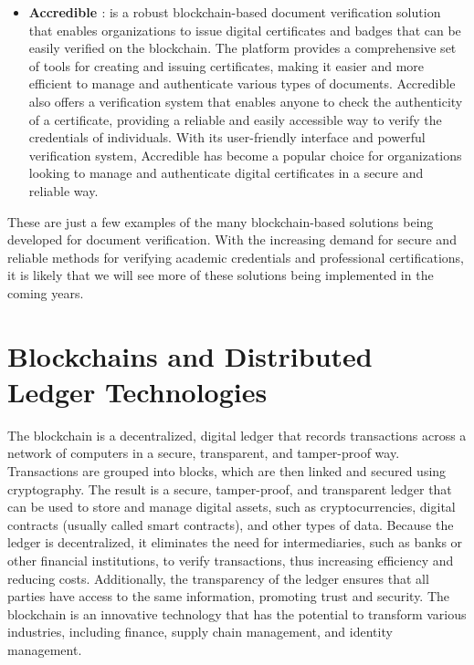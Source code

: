 \documentclass[target=mst,aauheader=]{thud}
\begin{document}
\begin{itemize}
        \item \textbf{Accredible \cite{accredible}}: is a robust blockchain-based document verification solution that enables organizations to issue digital certificates and badges that can be easily verified on the blockchain. The platform provides a comprehensive set of tools for creating and issuing certificates, making it easier and more efficient to manage and authenticate various types of documents. Accredible also offers a verification system that enables anyone to check the authenticity of a certificate, providing a reliable and easily accessible way to verify the credentials of individuals. With its user-friendly interface and powerful verification system, Accredible has become a popular choice for organizations looking to manage and authenticate digital certificates in a secure and reliable way.

    \end{itemize}

These are just a few examples of the many blockchain-based solutions being developed for document verification. With the increasing demand for secure and reliable methods for verifying academic credentials and professional certifications, it is likely that we will see more of these solutions being implemented in the coming years.





\chapter{Blockchains and Distributed Ledger Technologies}
\label{chapter:blockchain}

The blockchain is a decentralized, digital ledger that records transactions across a network of computers in a secure, transparent, and tamper-proof way. Transactions are grouped into blocks, which are then linked and secured using cryptography. The result is a secure, tamper-proof, and transparent ledger that can be used to store and manage digital assets, such as cryptocurrencies, digital contracts (usually called smart contracts), and other types of data. Because the ledger is decentralized, it eliminates the need for intermediaries, such as banks or other financial institutions, to verify transactions, thus increasing efficiency and reducing costs. Additionally, the transparency of the ledger ensures that all parties have access to the same information, promoting trust and security. The blockchain is an innovative technology that has the potential to transform various industries, including finance, supply chain management, and identity management.
\end{document}
